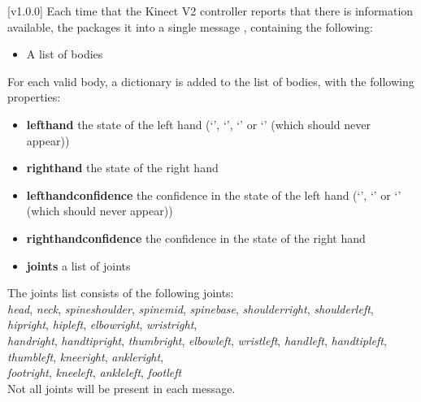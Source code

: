 [v1.0.0]
Each time that the Kinect V2 controller reports that there is information available,
the  packages it into a single message
\openSq{}\closeSq, containing the following:
\begin{itemize}
\item A list of bodies
\end{itemize}

For each valid body, a dictionary \openSq{}\closeSq{} is added to the list
of bodies, with the following properties:
\begin{itemize}
\item\textbf{lefthand} \longDash{} the state of the left hand (`',
`', `' or `' (which should never appear))
\item\exSp\textbf{righthand} \longDash{} the state of the right hand
\item\exSp\textbf{lefthandconfidence} \longDash{} the confidence in the state of the left
hand (`', `' or `' (which should never appear))
\item\exSp\textbf{righthandconfidence} \longDash{} the confidence in the state of the
right hand
\item\exSp\textbf{joints} \longDash{} a list of joints
\end{itemize}

The joints list consists of the following joints:\\
\textbraceleft{} \emph{head}, \emph{neck}, \emph{spineshoulder}, \emph{spinemid},
\emph{spinebase}, \emph{shoulderright}, \emph{shoulderleft}, \emph{hipright},
\emph{hipleft}, \emph{elbowright}, \emph{wristright},\\
\emph{handright}, \emph{handtipright}, \emph{thumbright}, \emph{elbowleft},
\emph{wristleft}, \emph{handleft}, \emph{handtipleft}, \emph{thumbleft}, \emph{kneeright},
\emph{ankleright},\\
\emph{footright}, \emph{kneeleft}, \emph{ankleleft}, \emph{footleft} \textbraceright\\

Not all joints will be present in each message.\\

